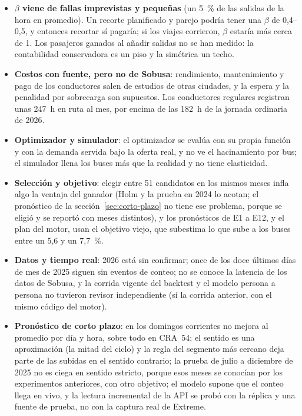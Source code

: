 \begin{itemize}
  \item \textbf{$\beta$ viene de fallas imprevistas y pequeñas} (un 5~\% de las salidas de la hora en promedio). Un
        recorte planificado y parejo podría tener una $\beta$ de 0,4--0,5, y entonces recortar sí pagaría; si los viajes
         corrieron, $\beta$ estaría más cerca de 1. Los pasajeros ganados al añadir salidas no se han
        medido: la contabilidad conservadora es un piso y la simétrica un techo.
  \item \textbf{Costos con fuente, pero no de Sobusa}: rendimiento, mantenimiento y pago de los conductores salen de
        estudios de otras ciudades, y la espera y la penalidad por sobrecarga son supuestos. Los conductores regulares
        registran unas 247~h en ruta al mes, por encima de las 182~h de la jornada ordinaria de 2026.
  \item \textbf{Optimizador y simulador}: el optimizador se evalúa con su propia función y con la demanda servida bajo la
        oferta real, y no ve el hacinamiento por bus; el simulador llena los buses más que la realidad y no tiene
        elasticidad.
  \item \textbf{Selección y objetivo}: elegir entre 51 candidatos en los mismos meses infla algo la ventaja del ganador
        (Holm y la prueba en 2024 lo acotan; el pronóstico de la sección~\ref{sec:corto-plazo} no tiene ese
        problema, porque se eligió y se reportó con meses distintos), y los pronósticos de E1 a E12, y el plan del
        motor, usan el objetivo
        viejo, que subestima lo que sube a los buses entre un 5,6 y un 7,7~\%.
  \item \textbf{Datos y tiempo real}: 2026 está sin confirmar; once de los doce últimos días de mes de 2025 siguen sin
        eventos de conteo; no se conoce la latencia de los datos de Sobusa, y la corrida vigente del backtest y el modelo
        persona a persona no tuvieron revisor independiente (sí la corrida anterior, con el mismo código del motor).
  \item \textbf{Pronóstico de corto plazo}: en los domingos corrientes no mejora al promedio por día y hora, sobre
        todo en CRA~54; el sentido es una aproximación (la mitad del ciclo) y la regla del
        segmento más cercano deja parte de las subidas en el sentido contrario; la prueba de julio a diciembre de
        2025 no es ciega en sentido estricto, porque esos meses se conocían por los experimentos anteriores, con
        otro objetivo; el modelo supone que el conteo llega en vivo, y la lectura incremental de la API se probó con
        la réplica y una fuente de prueba, no con la captura real de Extreme.
\end{itemize}
